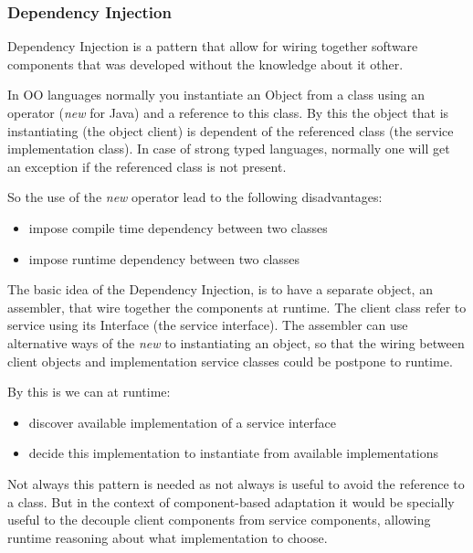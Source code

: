 \subsubsection{Dependency Injection}

Dependency Injection is a pattern that allow for wiring together software components that was developed without the knowledge about it other.~\cite{fowler_inversion_2004}

In OO languages normally you instantiate an Object from a class using an operator (\emph{new} for Java) and a reference to this class. By this the object that is instantiating (the object client) is dependent of the referenced class (the service implementation class). In case of strong typed languages, normally one will get an exception if the referenced class is not present.

So the use of the \emph{new} operator lead to the following disadvantages:
\begin{itemize}
  \item impose compile time dependency between two classes
  \item impose runtime dependency between two classes
\end{itemize}

The basic idea of the Dependency Injection, is to have a separate object, an assembler, that wire together the components at runtime\cite{fowler_inversion_2004}. The client class refer to service using its Interface (the service interface). The assembler can use alternative ways of the \emph{new} to instantiating an object, so that the wiring between client objects and implementation service classes could be postpone to runtime.

By this is we can at runtime:
\begin{itemize}
  \item discover available implementation of a service interface
  \item decide this implementation to instantiate from available implementations
\end{itemize}

Not always this pattern is needed as not always is useful to avoid the reference to a class. But in the context of component-based adaptation it would be specially useful to the decouple client components from service components, allowing runtime reasoning about what implementation to choose.

